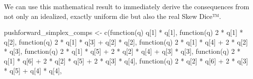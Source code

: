 \documentclass[
  letterpaper,
  DIV=11,
  numbers=noendperiod]{scrartcl}
\newenvironment{Shaded}{\begin{snugshade}}{\end{snugshade}}
\newcommand{\ControlFlowTok}[1]{\textcolor[rgb]{0.00,0.23,0.31}{#1}}
\newcommand{\DecValTok}[1]{\textcolor[rgb]{0.68,0.00,0.00}{#1}}
\newcommand{\FunctionTok}[1]{\textcolor[rgb]{0.28,0.35,0.67}{#1}}
\newcommand{\NormalTok}[1]{\textcolor[rgb]{0.00,0.23,0.31}{#1}}
\newcommand{\OtherTok}[1]{\textcolor[rgb]{0.00,0.23,0.31}{#1}}
\newcommand{\SpecialCharTok}[1]{\textcolor[rgb]{0.37,0.37,0.37}{#1}}
\begin{document}
We can use this mathematical result to immediately derive the
consequences from not only an idealized, exactly uniform die but also
the real Skew Dice™.

\begin{Shaded}
\begin{Highlighting}[]
\NormalTok{pushforward\_simplex\_comps }\OtherTok{\textless{}{-}}
  \FunctionTok{c}\NormalTok{(}\ControlFlowTok{function}\NormalTok{(q)}
\NormalTok{         q[}\DecValTok{1}\NormalTok{] }\SpecialCharTok{*}\NormalTok{ q[}\DecValTok{1}\NormalTok{],}
    \ControlFlowTok{function}\NormalTok{(q)}
     \DecValTok{2} \SpecialCharTok{*}\NormalTok{ q[}\DecValTok{1}\NormalTok{] }\SpecialCharTok{*}\NormalTok{ q[}\DecValTok{2}\NormalTok{],}
    \ControlFlowTok{function}\NormalTok{(q)}
     \DecValTok{2} \SpecialCharTok{*}\NormalTok{ q[}\DecValTok{1}\NormalTok{] }\SpecialCharTok{*}\NormalTok{ q[}\DecValTok{3}\NormalTok{] }\SpecialCharTok{+}\NormalTok{     q[}\DecValTok{2}\NormalTok{] }\SpecialCharTok{*}\NormalTok{ q[}\DecValTok{2}\NormalTok{],}
    \ControlFlowTok{function}\NormalTok{(q)}
     \DecValTok{2} \SpecialCharTok{*}\NormalTok{ q[}\DecValTok{1}\NormalTok{] }\SpecialCharTok{*}\NormalTok{ q[}\DecValTok{4}\NormalTok{] }\SpecialCharTok{+} \DecValTok{2} \SpecialCharTok{*}\NormalTok{ q[}\DecValTok{2}\NormalTok{] }\SpecialCharTok{*}\NormalTok{ q[}\DecValTok{3}\NormalTok{],}
    \ControlFlowTok{function}\NormalTok{(q)}
     \DecValTok{2} \SpecialCharTok{*}\NormalTok{ q[}\DecValTok{1}\NormalTok{] }\SpecialCharTok{*}\NormalTok{ q[}\DecValTok{5}\NormalTok{] }\SpecialCharTok{+} \DecValTok{2} \SpecialCharTok{*}\NormalTok{ q[}\DecValTok{2}\NormalTok{] }\SpecialCharTok{*}\NormalTok{ q[}\DecValTok{4}\NormalTok{] }\SpecialCharTok{+}\NormalTok{     q[}\DecValTok{3}\NormalTok{] }\SpecialCharTok{*}\NormalTok{ q[}\DecValTok{3}\NormalTok{],}
    \ControlFlowTok{function}\NormalTok{(q)}
     \DecValTok{2} \SpecialCharTok{*}\NormalTok{ q[}\DecValTok{1}\NormalTok{] }\SpecialCharTok{*}\NormalTok{ q[}\DecValTok{6}\NormalTok{] }\SpecialCharTok{+} \DecValTok{2} \SpecialCharTok{*}\NormalTok{ q[}\DecValTok{2}\NormalTok{] }\SpecialCharTok{*}\NormalTok{ q[}\DecValTok{5}\NormalTok{] }\SpecialCharTok{+} \DecValTok{2} \SpecialCharTok{*}\NormalTok{ q[}\DecValTok{3}\NormalTok{] }\SpecialCharTok{*}\NormalTok{ q[}\DecValTok{4}\NormalTok{],}
    \ControlFlowTok{function}\NormalTok{(q)}
     \DecValTok{2} \SpecialCharTok{*}\NormalTok{ q[}\DecValTok{2}\NormalTok{] }\SpecialCharTok{*}\NormalTok{ q[}\DecValTok{6}\NormalTok{] }\SpecialCharTok{+} \DecValTok{2} \SpecialCharTok{*}\NormalTok{ q[}\DecValTok{3}\NormalTok{] }\SpecialCharTok{*}\NormalTok{ q[}\DecValTok{5}\NormalTok{] }\SpecialCharTok{+}\NormalTok{     q[}\DecValTok{4}\NormalTok{] }\SpecialCharTok{*}\NormalTok{ q[}\DecValTok{4}\NormalTok{],}

\end{Highlighting}
\end{Shaded}
\end{document}
